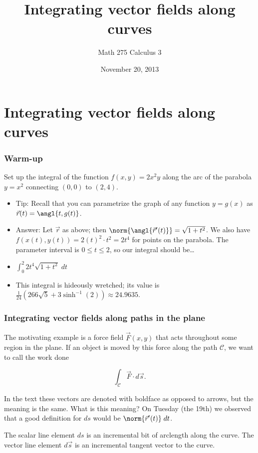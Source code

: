 \documentclass[11pt,ignorenonframetext,aspectratio=169,xcolor={svgnames}]{beamer}
\title{Integrating vector fields along curves}
\author{Math 275 Calculus 3}
\date{November 20, 2013}
\begin{document}
\frame{\titlepage}

\section{Integrating vector fields along curves}

\begin{frame}\frametitle{Warm-up}

Set up the integral of the function $f(x,y) = 2x^2 y$ along the arc of
the parabola $y = x^2$ connecting $(0,0)$ to $(2,4)$.

\begin{itemize}[<+->]
\itemsep1pt\parskip0pt
\item
  Tip: Recall that you can parametrize the graph of any function
  $y = g(x)$ as $\vec{r}(t) = \angl{t, g(t)}$.
\item
  Answer: Let $\vec{r}$ as above; then
  $\norm{\angl{\vec{r}'(t)}} = \sqrt{1+t^2}$. We also have
  $f(x(t),y(t)) = 2(t)^2 \cdot t^2 = 2t^4$ for points on the parabola.
  The parameter interval is $0 \leq t \leq 2$, so our integral should
  be\ldots{}
\item
  $\int_0^2 2t^4 \sqrt{1+t^2} \; dt$
\item
  This integral is hideously wretched; its value is
  $\frac{1}{24} \left( 266 \sqrt{5} + 3 \sinh^{-1}(2) \right) \approx 24.9635$.
\end{itemize}

\end{frame}

\begin{frame}\frametitle{Integrating vector fields along paths in the
plane}

The motivating example is a force field $\vec{F}(x,y)$ that acts
throughout some region in the plane. If an object is moved by this force
along the path $\mathcal{C}$, we want to call the work done

\begin{equation*}
    \int_{\mathcal{C}} \vec{F} \cdot d\vec{s}.
\end{equation*}

In the text these vectors are denoted with boldface as opposed to
arrows, but the meaning is the same. What is this meaning? On Tuesday
(the 19th) we observed that a good definition for $ds$ would be
$\norm{\vec{r}'(t)} \; dt$.

The scalar line element $ds$ is an incremental bit of arclength along
the curve. The vector line element $d\vec{s}$ is an incremental tangent
vector to the curve.

\end{frame}
\end{document}
